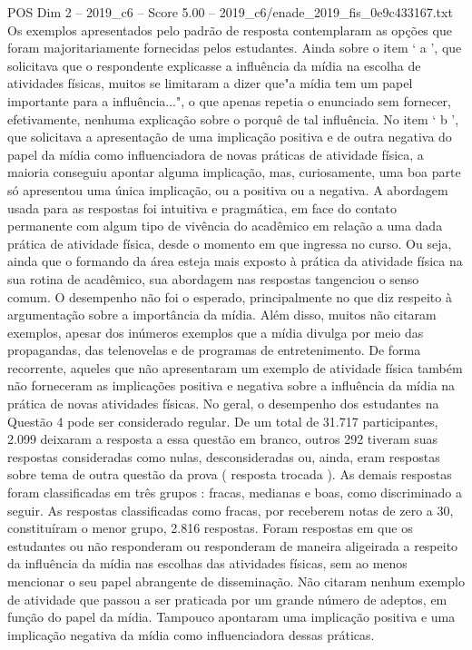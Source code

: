 \begin{textsample}{POS Dim 2 – 2019\_c6 – Score 5.00 – 2019\_c6/enade\_2019\_fis\_0e9c433167.txt}
Os exemplos apresentados pelo padrão de resposta contemplaram as opções que foram majoritariamente fornecidas pelos estudantes.
Ainda sobre o item ‘ a ’, que solicitava que o respondente explicasse a influência da mídia na escolha de atividades físicas, muitos se limitaram a dizer que"a mídia tem um papel importante para a influência...", o que apenas repetia o enunciado sem fornecer, efetivamente, nenhuma explicação sobre o porquê de tal influência.
No item ‘ b ’, que solicitava a apresentação de uma implicação positiva e de outra negativa do papel da mídia como influenciadora de novas práticas de atividade física, a maioria conseguiu apontar alguma implicação, mas, curiosamente, uma boa parte só apresentou uma única implicação, ou a positiva ou a negativa.
A abordagem usada para as respostas foi intuitiva e pragmática, em face do contato permanente com algum tipo de vivência do acadêmico em relação a uma dada prática de atividade física, desde o momento em que ingressa no curso.
Ou seja, ainda que o formando da área esteja mais exposto à prática da atividade física na sua rotina de acadêmico, sua abordagem nas respostas tangenciou o senso comum.
O desempenho não foi o esperado, principalmente no que diz respeito à argumentação sobre a importância da mídia.
Além disso, muitos não citaram exemplos, apesar dos inúmeros exemplos que a mídia divulga por meio das propagandas, das telenovelas e de programas de entretenimento.
De forma recorrente, aqueles que não apresentaram um exemplo de atividade física também não forneceram as implicações positiva e negativa sobre a influência da mídia na prática de novas atividades físicas.
No geral, o desempenho dos estudantes na Questão 4 pode ser considerado regular.
De um total de 31.717 participantes, 2.099 deixaram a resposta a essa questão em branco, outros 292 tiveram suas respostas consideradas como nulas, desconsideradas ou, ainda, eram respostas sobre tema de outra questão da prova ( resposta trocada ).
As demais respostas foram classificadas em três grupos : fracas, medianas e boas, como discriminado a seguir.
As respostas classificadas como fracas, por receberem notas de zero a 30, constituíram o menor grupo, 2.816 respostas.
Foram respostas em que os estudantes ou não responderam ou responderam de maneira aligeirada a respeito da influência da mídia nas escolhas das atividades físicas, sem ao menos mencionar o seu papel abrangente de disseminação.
Não citaram nenhum exemplo de atividade que passou a ser praticada por um grande número de adeptos, em função do papel da mídia.
Tampouco apontaram uma implicação positiva e uma implicação negativa da mídia como influenciadora dessas práticas.

\end{textsample}
